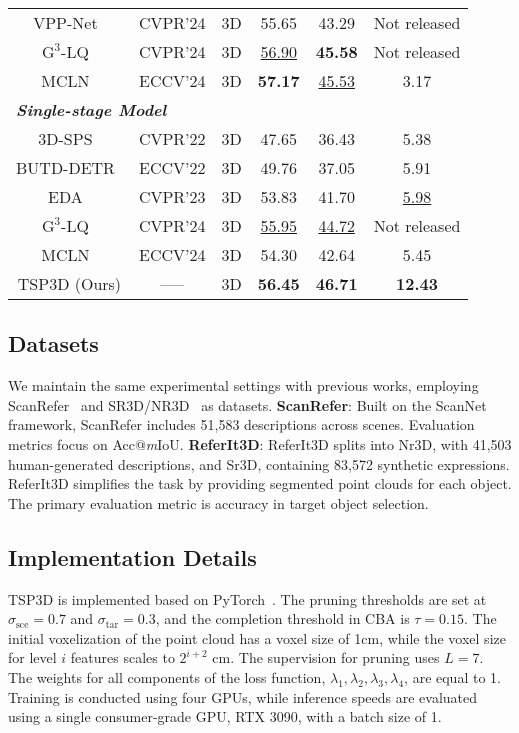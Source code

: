 \begin{table}[t]
{\begin{tabular}{@{}cccccc@{}}
VPP-Net~\citep{shi2024aware} & CVPR'24  & 3D & 55.65 & 43.29 & Not released \\
\(\text{G}^3\)-LQ~\citep{wang2024g} & CVPR'24  & 3D & \underline{56.90} & \textbf{45.58} & Not released \\
MCLN~\citep{qian2025multi} & ECCV'24  & 3D & \textbf{57.17} & \underline{45.53} & 3.17 \\
\midrule
\multicolumn{6}{l}{\textbf{\textit{Single-stage Model} }} \\
\midrule
3D-SPS~\citep{luo20223d} & CVPR'22  & 3D & 47.65 & 36.43 & 5.38 \\
BUTD-DETR~\citep{jain2022bottom}  & ECCV'22  & 3D & 49.76 & 37.05 & 5.91 \\
EDA~\citep{wu2023eda}  & CVPR'23  & 3D & 53.83 & 41.70 & \underline{5.98} \\
\(\text{G}^3\)-LQ~\citep{wang2024g} & CVPR'24  & 3D & \underline{55.95} & \underline{44.72} & Not released \\
MCLN~\citep{qian2025multi} & ECCV'24  & 3D & 54.30 & 42.64 & 5.45 \\
TSP3D (Ours)    & -----  & 3D & \textbf{56.45} & \textbf{46.71} &  \textbf{12.43} \\
\bottomrule
\end{tabular}
}
\vspace{-.2cm}
\end{table}

\subsection{Datasets}
We maintain the same experimental settings with previous works, employing ScanRefer~\citep{chen2020scanrefer} and SR3D/NR3D~\citep{achlioptas2020referit3d} as datasets.
\textbf{ScanRefer}: Built on the ScanNet framework, ScanRefer includes 51,583 descriptions across scenes. Evaluation metrics focus on Acc@\textit{m}IoU.
\textbf{ReferIt3D}: ReferIt3D splits into Nr3D, with 41,503 human-generated descriptions, and Sr3D, containing 83,572 synthetic expressions. ReferIt3D simplifies the task by providing segmented point clouds for each object. The primary evaluation metric is accuracy in target object selection.

\subsection{Implementation Details}
TSP3D is implemented based on PyTorch~\citep{paszke2019pytorch}. 
The pruning thresholds are set at \(\sigma_\text{sce} = 0.7\) and \(\sigma_\text{tar} = 0.3\), and the completion threshold in CBA is \(\tau = 0.15 \). The initial voxelization of the point cloud has a voxel size of 1cm, while the voxel size for level \(i\) features scales to \(2^{i+2}\) cm. The supervision for pruning uses \(L = 7\). The weights for all components of the loss function, \(\lambda_1, \lambda_2, \lambda_3, \lambda_4\), are equal to 1. Training is conducted using four GPUs, while inference speeds are evaluated using a single consumer-grade GPU, RTX 3090, with a batch size of 1.


